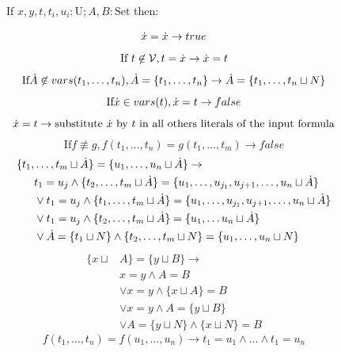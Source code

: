 \documentclass[12pt,a4paper,openright]{book}  %
\begin{document}
\begin{figure}
	\begin{tcolorbox}[colframe=black, colback=white, sharp corners]
		\setcounter{equation}{0}
		\renewcommand{\theequation}{=\textsubscript{\arabic{equation}}}

		If $x, y, t, t_i, u_i: \text{U}; A,B: \text{Set}$ then:

		\begin{equation}
		\dot{x} = \dot{x} \to true
		\end{equation}
		\begin{equation}
		\text{If } t \not\in \mathcal{V}, t = \dot{x} \to \\ \dot{x} = t
		\end{equation}
		\begin{equation}
		\text{If} \dot{A} \not\in vars(t_1, \ldots, t_n), \dot{A} = \{ t_1, \ldots, t_n \} \to \dot{A} = \{ t_1, \ldots, t_n \sqcup N \}
		\end{equation}
		\begin{equation}
		\text{If} \dot{x} \in vars(t), \dot{x} = t \to false
		\end{equation}
		\begin{equation}
		\dot{x} = t \to \text{substitute $\dot{x}$ by $t$ in all others literals of the input formula}
		\end{equation}
		\begin{equation}
		\text{If} f \not\equiv g, f(t_1, \ldots, t_n) = g(t_1, \ldots, t_m) \to false
		\end{equation}
		\begin{equation}
		\begin{split}
		\{ t_1, & \ldots, t_m \sqcup \dot{A} \} = \{u_1, \ldots, u_n \sqcup \dot{A} \} \to \\
		& t_1 = u_j \land \{ t_2, \ldots, t_m \sqcup \dot{A} \} = \{ u_1, \ldots, u_{j_1}, u_{j+1}, \ldots, u_n \sqcup \dot{A} \} \\
		& \lor t_1 = u_j \land \{ t_1, \ldots, t_m \sqcup \dot{A} \} = \{ u_1, \ldots, u_{j_1}, u_{j+1}, \ldots, u_n \sqcup \dot{A} \} \\
		& \lor t_1 = u_j \land \{ t_2, \ldots, t_m \sqcup \dot{A} \} = \{ u_1, \ldots u_n \sqcup \dot{A} \} \\
		& \lor \dot{A} = \{ t_1 \sqcup N \} \land \{ t_2, \ldots, t_m \sqcup N \} = \{ u_1, \ldots, u_n \sqcup N \}
		\end{split}
		\end{equation}
		\begin{equation}
		\begin{split}
		\{ x \sqcup & A \} = \{ y \sqcup B \} \to \\
		& x = y \land A = B \\
		& \lor x = y \land \{ x \sqcup A \} = B \\
		& \lor x = y \land A = \{ y \sqcup B \} \\
		& \lor A = \{ y \sqcup N \} \land \{ x \sqcup N \} = B
		\end{split}
		\end{equation}
		\begin{equation}
		f(t_1, \ldots, t_n) = f(u_1, \ldots, u_n) \to t_1 = u_1 \land \ldots \land t_1 = u_n
		\end{equation}


\end{tcolorbox}
\end{figure}
\end{document}
